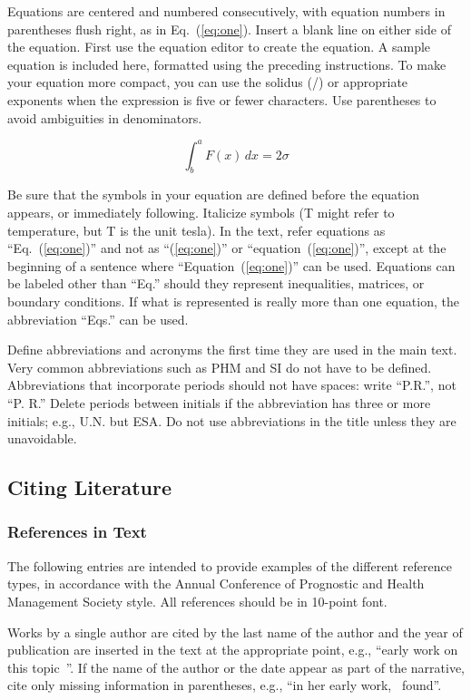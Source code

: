 \documentclass[IJPHM, 2014, 00]{PHMSociety}
\begin{document}
Equations are centered and numbered consecutively, with equation numbers in parentheses flush right, as in Eq.~(\ref{eq:one}). Insert a blank line on either side of the equation. First use the equation editor to create the equation.
A sample equation is included here, formatted using the preceding instructions. To make your equation more compact, you can use the solidus (/) or appropriate exponents when the expression is five or fewer characters.  Use parentheses to avoid ambiguities in denominators.


\begin{equation}
\int^{a}_{b}F(x)\,dx = 2\sigma
\label{eq:one}
\end{equation}


Be sure that the symbols in your equation are defined before the equation appears, or immediately following. Italicize symbols (T might refer to temperature, but T is the unit tesla). In the text, refer equations as ``Eq.~(\ref{eq:one})'' and not as ``(\ref{eq:one})'' or ``equation~(\ref{eq:one})'', except at the beginning of a sentence where ``Equation~(\ref{eq:one})'' can be used. Equations can be labeled other than ``Eq.'' should they represent inequalities, matrices, or boundary conditions. If what is represented is really more than one equation, the abbreviation ``Eqs.'' can be used.

Define abbreviations and acronyms the first time they are used in the main text. Very common abbreviations such as PHM and SI do not have to be defined. Abbreviations that incorporate periods should not have spaces: write ``P.R.'', not ``P. R.'' Delete periods between initials if the abbreviation has three or more initials; e.g., U.N. but ESA. Do not use abbreviations in the title unless they are unavoidable.

\subsection{Citing Literature}

\subsubsection{References in Text}
The following entries are intended to provide examples of the different reference types, in accordance with the Annual Conference of Prognostic and Health Management Society style. All references should be in 10-point font.

Works by a single author are cited by the last name of the author and the year of publication are inserted in the text at the appropriate point, e.g., ``early work on this topic~\cite{ferrell}''. If the name of the author or the date appear as part of the narrative, cite only missing information in parentheses, e.g., ``in her early work,~\cite{ferrell} found''.
\end{document}
